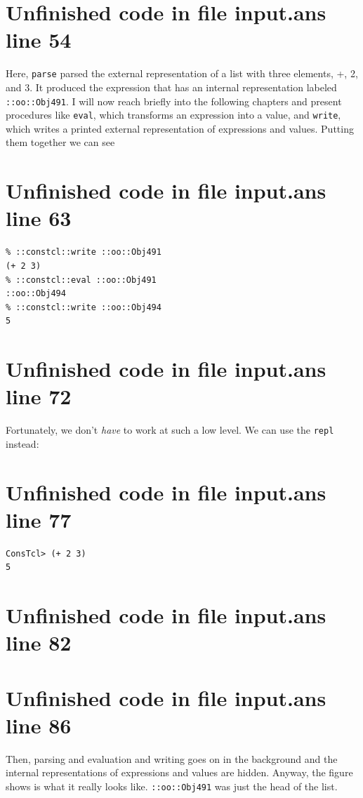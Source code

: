 \documentclass[twoside,9pt]{report}
\begin{document}
\section{Unfinished code in file input.ans line 54}


Here, \texttt{parse} parsed the external representation of a list with three elements, +, 2, and 3. It produced the expression that has an internal representation labeled \texttt{::oo::Obj491}. I will now reach briefly into the following chapters and present procedures like \texttt{eval}, which transforms an expression into a value, and \texttt{write}, which writes a printed external representation of expressions and values. Putting them together we can see

\section{Unfinished code in file input.ans line 63}
\begin{verbatim}
% ::constcl::write ::oo::Obj491
(+ 2 3)
% ::constcl::eval ::oo::Obj491
::oo::Obj494
% ::constcl::write ::oo::Obj494
5
\end{verbatim}
\section{Unfinished code in file input.ans line 72}


Fortunately, we don't \emph{have} to work at such a low level. We can use the \texttt{repl} instead:

\section{Unfinished code in file input.ans line 77}
\begin{verbatim}
ConsTcl> (+ 2 3)
5
\end{verbatim}
\section{Unfinished code in file input.ans line 82}

\section{Unfinished code in file input.ans line 86}

Then, parsing and evaluation and writing goes on in the background and the internal representations of expressions and values are hidden. Anyway, the figure shows is what it really looks like. \texttt{::oo::Obj491} was just the head of the list.
\end{document}
